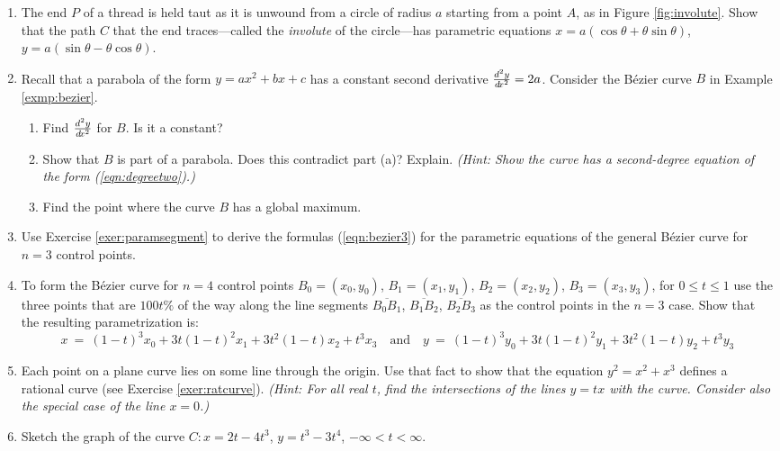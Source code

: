 {\begin{enumerate}[\bfseries 1.]
\begin{figure}[h]
\end{figure}\vspace{-2mm}
[{[\bfseries 1.]}]
 \item\label{exer:involute} The end $P$ of a thread is held taut as it is
  unwound from a circle of radius $a$ starting from a point $A$, as in Figure
  \ref{fig:involute}. Show that the path $C$ that the end traces---called the
  \emph{involute} of the circle---has parametric
  equations $x=a(\cos \theta + \theta \sin \theta)$,
  $y=a(\sin \theta - \theta \cos \theta)$.
 \item Recall that a parabola of the form $y=ax^2+bx+c$ has a constant second
  derivative $\frac{d^2y}{d\!x^2} = 2a$. Consider the B\'{e}zier curve $B$ in
  Example \ref{exmp:bezier}.
\begin{enumerate}[\bfseries (a)]
 \item Find $\frac{d^2y}{d\!x^2}$ for $B$. Is it a constant?
 \item Show that $B$ is part of a parabola. Does this contradict part (a)?
  Explain. \emph{(Hint: Show the curve has a second-degree equation of the form
  (\ref{eqn:degreetwo}).)}
 \item Find the point where the curve $B$ has a global maximum.
\end{enumerate}
 \item Use Exercise \ref{exer:paramsegment} to derive the formulas
  (\ref{eqn:bezier3}) for the parametric equations of the general B\'{e}zier
  curve for $n=3$ control points.
 \item To form the B\'{e}zier curve for $n=4$ control points $B_0=(x_0,y_0)$,
  $B_1=(x_1,y_1)$, $B_2=(x_2,y_2)$, $B_3=(x_3,y_3)$, for $0 \le t \le 1$ use
  the three points that are $100t\%$ of the way along the line segments
  $\overline{B_0B_1}$, $\overline{B_1B_2}$, $\overline{B_2B_3}$ as the control
  points in the $n=3$ case. Show that the resulting parametrization is:
\[
x ~=~ (1-t)^3x_0 + 3t(1-t)^2x_1 + 3t^2(1-t)x_2 + t^3x_3 \quad\text{and}\quad
y ~=~ (1-t)^3y_0 + 3t(1-t)^2y_1 + 3t^2(1-t)y_2 + t^3y_3
\]
 \item Each point on a plane curve lies on some line through the origin. Use
  that fact to show that the equation $y^2=x^2+x^3$ defines a rational curve
  (see Exercise \ref{exer:ratcurve}). \emph{(Hint: For all real $t$, find the
  intersections of the lines $y=tx$ with the curve. Consider also the special
  case of the line $x=0$.)}
 \item Sketch the graph of the curve $C: x=2t-4t^3$, $y=t^3-3t^4$,
  $-\infty < t < \infty$.
\end{enumerate}
}
\newpage
